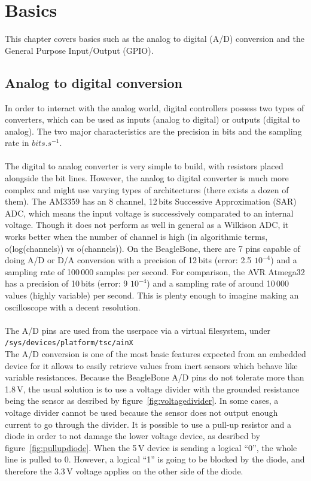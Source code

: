 \chapter{Basics}

This chapter covers basics such as the analog to digital (A/D) conversion and the General Purpose Input/Output (GPIO).

\section{Analog to digital conversion}

In order to interact with the analog world, digital controllers possess two types of converters, which can be used as inputs (analog to digital) or outputs (digital to analog). The two major characteristics are the precision in bits and the sampling rate in $bits.s^{-1}$.
\\
\\
The digital to analog converter is very simple to build, with resistors placed alongside the bit lines. However, the analog to digital converter is much more complex and might use varying types of architectures (there exists a dozen of them). The AM3359 has an 8 channel, 12\,bits Successive Approximation (SAR) ADC, which means the input voltage is successively comparated to an internal voltage. Though it does not perform as well in general as a Wilkison ADC, it works better when the number of channel is high (in algorithmic terms, o(log(channels)) vs o(channels)). On the BeagleBone, there are 7 pins capable of doing A/D or D/A conversion with a precision of 12\,bits (error: 2.5 $10^{-4}$) and a sampling rate of 100\,000 samples per second. For comparison, the AVR Atmega32 has a precision of 10\,bits (error: 9 $10^{-4}$) and a sampling rate of around 10\,000 values (highly variable) per second. This is plenty enough to imagine making an oscilloscope with a decent resolution.
\\
\\
The A/D pins are used from the userpace via a virtual filesystem, under
\\
\verb!/sys/devices/platform/tsc/ainX!
\\
The A/D conversion is one of the most basic features expected from an embedded device for it allows to easily retrieve values from inert sensors which behave like variable resistances. Because the BeagleBone A/D pins do not tolerate more than 1.8\,V, the usual solution is to use a voltage divider with the grounded resistance being the sensor as desribed by figure~\ref{fig:voltagedivider}.
In some cases, a voltage divider cannot be used because the sensor does not output enough current to go through the divider. It is possible to use a pull-up resistor and a diode in order to not damage the lower voltage device, as desribed by figure~\ref{fig:pullupdiode}. When the 5\,V device is sending a logical ``0'', the whole line is pulled to 0. However, a logical ``1'' is going to be blocked by the diode, and therefore the 3.3\,V voltage applies on the other side of the diode.

